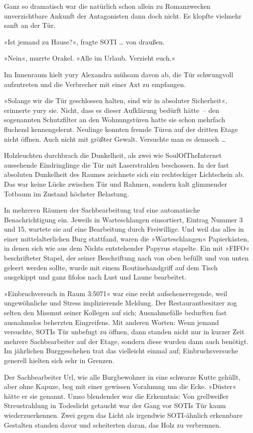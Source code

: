 Ganz so dramatisch war die natürlich schon allein zu Romanzwecken unverzichtbare Ankunft der Antagonisten dann doch nicht. Es klopfte vielmehr sanft an der Tür.

»Ist jemand zu Hause?«, fragte SOTI … von draußen.

»Nein«, murrte Orakel. »Alle im Urlaub. Verzieht euch.«

Im Innenraum hielt yury Alexandra mühsam davon ab, die Tür schwungvoll aufzutreten und die Verbrecher mit einer Axt zu empfangen.

»Solange wir die Tür geschlossen halten, sind wir in absoluter Sicherheit«, erinnerte yury sie. Nicht, dass es dieser Aufklärung bedürft hätte~– den sogenannten Schutzfilter an den Wohnungstüren hatte sie schon mehrfach fluchend kennengelernt. Neulinge konnten fremde Türen auf der dritten Etage nicht öffnen. Auch nicht mit größter Gewalt. Versuchte man es dennoch …

Holzleuchten durchbrach die Dunkelheit, als zwei wie SoulOfTheInternet aussehende Eindringlinge die Tür mit Laserstrahlen beschossen. In der fast absoluten Dunkelheit des Raumes zeichnete sich ein rechteckiger Lichtschein ab. Das war keine Lücke zwischen Tür und Rahmen, sondern kalt glimmender Totbaum im Zustand höchster Belastung.

In mehreren Räumen der Sachbearbeitung traf eine automatische Benachrichtigung ein. Jeweils in Warteschlangen einsortiert, Eintrag Nummer 3 und 15, wartete sie auf eine Bearbeitung durch Freiwillige. Und weil das alles in einer mittelalterlichen Burg stattfand, waren die »Warteschlangen« Papierkästen, in denen sich wie aus dem Nichts entstehender Papyrus stapelte. Ein mit »FIFO« beschrifteter Stapel, der seiner Beschriftung nach von oben befüllt und von unten geleert werden sollte, wurde mit einem Routinehandgriff auf dem Tisch ausgekippt und ganz fifolos nach Lust und Laune bearbeitet.

»Einbruchversuch in Raum 3:5071« war eine recht aufsehenerregende, weil ungewöhnliche und Stress implizierende Meldung. Der Restaurantbesitzer zog selten den Missmut seiner Kollegen auf sich; Ausnahmefälle bedurften fast ausnahmslos beherzten Eingreifens. Mit anderen Worten: Wenn jemand versuchte, SOTIs Tür unbefugt zu öffnen, dann standen nicht nur in kurzer Zeit mehrere Sachbearbeiter auf der Etage, sondern diese wurden dann auch benötigt. Im jährlichen Burggeschehen trat das vielleicht einmal auf; Einbruchsversuche generell hielten sich sehr in Grenzen.

Der Sachbearbeiter Url, wie alle Burgbewohner in eine schwarze Kutte gehüllt, aber ohne Kapuze, bog mit einer gewissen Vorahnung um die Ecke. »Düster« hätte er sie genannt. Umso blendender war die Erkenntnis: Von grellweißer Streustrahlung in Todeslicht getaucht war der Gang vor SOTIs Tür kaum wiederzuerkennen. Zwei gegen das Licht als irgendwie SOTI-ähnlich erkennbare Gestalten standen davor und scheiterten daran, das Holz zu verbrennen.

